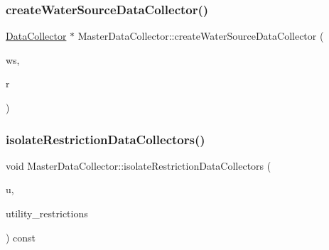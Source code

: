 \mbox{\label{classMasterDataCollector_af14c96886904b8b044484cb0533fc43d_af14c96886904b8b044484cb0533fc43d}} 
\subsubsection{\texorpdfstring{create\+Water\+Source\+Data\+Collector()}{createWaterSourceDataCollector()}}
{\footnotesize\ttfamily \mbox{\hyperlink{classDataCollector}{Data\+Collector}} $\ast$ Master\+Data\+Collector\+::create\+Water\+Source\+Data\+Collector (\begin{DoxyParamCaption}\item[{\mbox{\hyperlink{classWaterSource}{Water\+Source}} $\ast$}]{ws,  }\item[{unsigned long}]{r }\end{DoxyParamCaption})}

\mbox{\label{classMasterDataCollector_a640eed0cb3e00679463601adbdd3d1e6_a640eed0cb3e00679463601adbdd3d1e6}} 
\subsubsection{\texorpdfstring{isolate\+Restriction\+Data\+Collectors()}{isolateRestrictionDataCollectors()}}
{\footnotesize\ttfamily void Master\+Data\+Collector\+::isolate\+Restriction\+Data\+Collectors (\begin{DoxyParamCaption}\item[{vector$<$ \mbox{\hyperlink{classUtilitiesDataCollector}{Utilities\+Data\+Collector}} $\ast$$>$ \&}]{u,  }\item[{vector$<$ \mbox{\hyperlink{classRestrictionsDataCollector}{Restrictions\+Data\+Collector}} $\ast$$>$ \&}]{utility\+\_\+restrictions }\end{DoxyParamCaption}) const}


